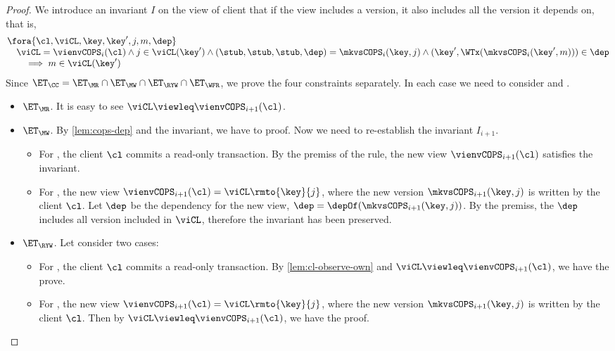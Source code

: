 \begin{proof}
    We introduce an invariant \( I \) on the view of client that if the view includes a version, 
    it also includes all the version it depends on, that is,
    \[
        \begin{array}{@{}l@{}}
        \fora{\cl, \viCL,\key,\key',j,m,\dep} \\
        \quad \viCL = \vienvCOPS_i(\cl) \land j \in \viCL(\key') 
        \land (\stub,\stub,\stub,\dep) = \mkvsCOPS_i(\key,j)
        \land (\key',\WTx(\mkvsCOPS_i(\key',m))) \in \dep \\
        \qquad \implies m \in \viCL(\key')
        \end{array}
    \]
    Since \( \ET_\CC = \ET_\MR \cap \ET_\MW \cap \ET_\RYW \cap \ET_\WFR \), we prove the four constraints separately.
    In each case we need to consider  and .
    \begin{itemize}
        \item \( \ET_\MR \). 
            It is easy to see \( \viCL \viewleq \vienvCOPS_{i+1}(\cl) \).

        \item \( \ET_\MW \).
            By \cref{lem:cops-dep} and the invariant, we have to proof.
            Now we need to re-establish the invariant \( I_{i+1} \).
            \begin{itemize}
                \item 
                For , the client \( \cl \) commits a read-only transaction.
                By the premiss of the rule, the new view \( \vienvCOPS_{i+1}(\cl) \) satisfies the invariant.
                \item For , the new view \( \vienvCOPS_{i+1}(\cl) = \viCL\rmto{\key}{j} \),
                where the new version \( \mkvsCOPS_{i+1}(\key,j)\) is written by the client \( \cl \).
                Let \( \dep \) be the dependency for the new view, \ie \( \dep = \depOf(\mkvsCOPS_{i+1}(\key,j)) \).
                By the premiss, the \( \dep \) includes all version included in \( \viCL \), 
                therefore the invariant has been preserved.
            \end{itemize}

        \item \( \ET_\RYW \). Let consider two cases:
            \begin{itemize}
                \item 
                For , the client \( \cl \) commits a read-only transaction.
                By \cref{lem:cl-observe-own} and  \( \viCL \viewleq \vienvCOPS_{i+1}(\cl) \),
                we have the prove.
            \item For , the new view \( \vienvCOPS_{i+1}(\cl) = \viCL\rmto{\key}{j} \),
                where the new version \( \mkvsCOPS_{i+1}(\key,j)\) is written by the client \( \cl \).
                Then by \( \viCL \viewleq \vienvCOPS_{i+1}(\cl) \), we have the proof.
            \end{itemize}


\end{itemize}
\end{proof}
